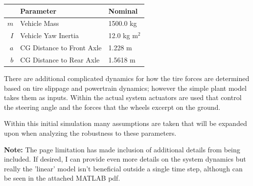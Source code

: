 \documentclass[conference, onecolumn]{IEEEtran}
\begin{document}
    \begin{tabular}{|r|l|l|}
        \hline
            & Parameter & Nominal\\
        \hline
        $m$ & Vehicle Mass & 1500.0 kg\\
        \hline
        $I$ & Vehicle Yaw Inertia & 12.0 kg m$^2$\\
        \hline
        $a$ & CG Distance to Front Axle & 1.228 m\\
        \hline
        $b$ & CG Distance to Rear Axle & 1.5618 m\\
        \hline
    \end{tabular}

There are additional complicated dynamics for how the tire forces are determined based on tire slippage and powertrain dynamics; however the simple plant model takes them as inputs.
Within the actual system actuators are used that control the steering angle and the forces that the wheels excerpt on the ground.

Within this initial simulation many assumptions are taken that will be expanded upon when analyzing the robustness to these parameters.

\textbf{Note:} 
The page limitation has made inclusion of additional details from being included. 
If desired, I can provide even more details on the system dynamics but really the 'linear' model isn't beneficial outside a single time step, although can be seen in the attached MATLAB pdf.




\end{document}
